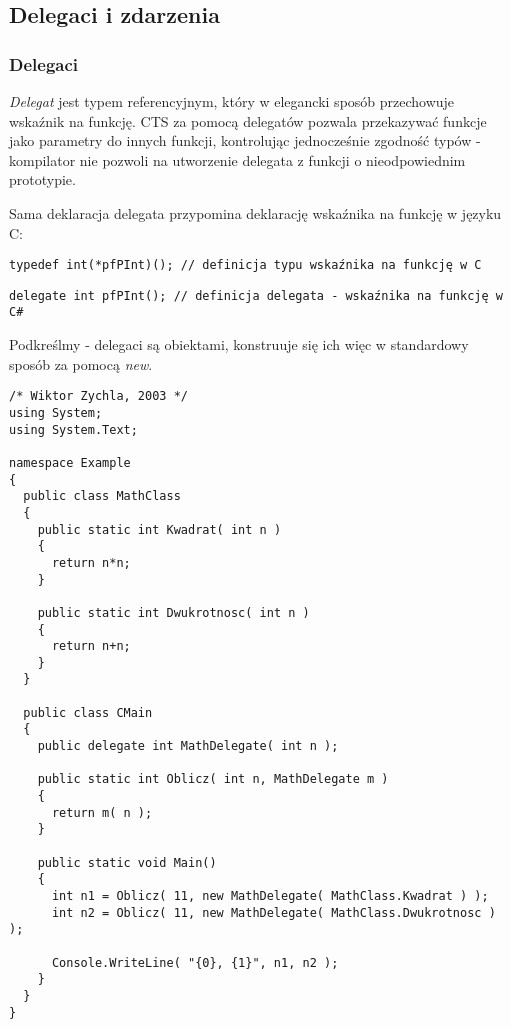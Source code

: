 ﻿\subsection{Delegaci i zdarzenia}
\label{delegaciZdarzenia}

\subsubsection{Delegaci}

{\em Delegat} jest typem referencyjnym, który w elegancki sposób przechowuje wskaźnik na funkcję. 
CTS za pomocą delegatów pozwala przekazywać funkcje jako parametry do innych funkcji, kontrolując 
jednocześnie zgodność typów - kompilator nie pozwoli na utworzenie delegata z funkcji o nieodpowiednim
prototypie.

Sama deklaracja delegata przypomina deklarację wskaźnika na funkcję w języku C:

\begin{scriptsize}
\begin{verbatim}
typedef int(*pfPInt)(); // definicja typu wskaźnika na funkcję w C
\end{verbatim}
\end{scriptsize}

\begin{scriptsize}
\begin{verbatim}
delegate int pfPInt(); // definicja delegata - wskaźnika na funkcję w C#
\end{verbatim}
\end{scriptsize}

Podkreślmy - delegaci są obiektami, konstruuje się ich więc w standardowy sposób za pomocą {\em new}.

\begin{scriptsize}
\begin{verbatim}
/* Wiktor Zychla, 2003 */
using System;
using System.Text;

namespace Example
{ 
  public class MathClass
  {
  	public static int Kwadrat( int n )
  	{
  	  return n*n;
  	}
  	
  	public static int Dwukrotnosc( int n )
  	{
  	  return n+n;
  	}
  }
	
  public class CMain
  {    
    public delegate int MathDelegate( int n );
  	
    public static int Oblicz( int n, MathDelegate m )
    {
      return m( n );
    }
  	
    public static void Main()
    {
      int n1 = Oblicz( 11, new MathDelegate( MathClass.Kwadrat ) );
      int n2 = Oblicz( 11, new MathDelegate( MathClass.Dwukrotnosc ) );
    	
      Console.WriteLine( "{0}, {1}", n1, n2 );
    }
  }
}
\end{verbatim}
\end{scriptsize}

